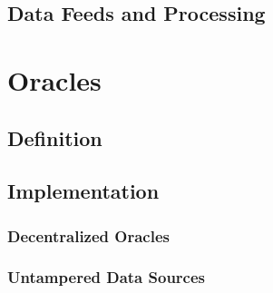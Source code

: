 \documentclass[conference]{IEEEtran}
\begin{document}
\subsection{Data Feeds and Processing}

\section{Oracles}
\subsection{Definition}
\subsection{Implementation}
\subsubsection{Decentralized Oracles}
\subsubsection{Untampered Data Sources}
\end{document}
